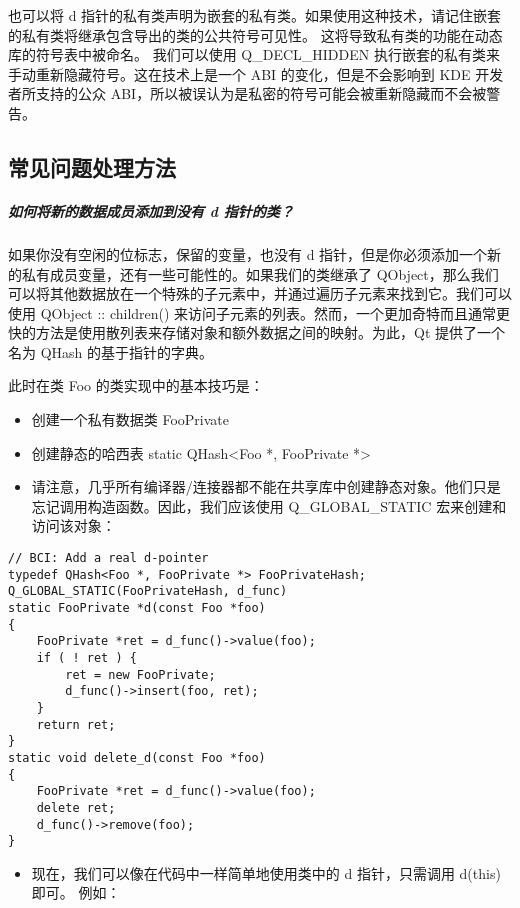 也可以将 d
指针的私有类声明为嵌套的私有类。如果使用这种技术，请记住嵌套的私有类将继承包含导出的类的公共符号可见性。
这将导致私有类的功能在动态库的符号表中被命名。 我们可以使用
Q\_DECL\_HIDDEN 执行嵌套的私有类来手动重新隐藏符号。这在技术上是一个 ABI
的变化，但是不会影响到 KDE 开发者所支持的公众
ABI，所以被误认为是私密的符号可能会被重新隐藏而不会被警告。

\subsection{常见问题处理方法}\label{ux5e38ux89c1ux95eeux9898ux5904ux7406ux65b9ux6cd5}

\subparagraph{如何将新的数据成员添加到没有 d
指针的类？}\label{ux5982ux4f55ux5c06ux65b0ux7684ux6570ux636eux6210ux5458ux6dfbux52a0ux5230ux6ca1ux6709-d-ux6307ux9488ux7684ux7c7b}

如果你没有空闲的位标志，保留的变量，也没有 d
指针，但是你必须添加一个新的私有成员变量，还有一些可能性的。如果我们的类继承了
QObject，那么我们可以将其他数据放在一个特殊的子元素中，并通过遍历子元素来找到它。我们可以使用
QObject :: children()
来访问子元素的列表。然而，一个更加奇特而且通常更快的方法是使用散列表来存储对象和额外数据之间的映射。为此，Qt
提供了一个名为 QHash 的基于指针的字典。

此时在类 Foo 的类实现中的基本技巧是：

\begin{itemize}

\item
  创建一个私有数据类 FooPrivate
\item
  创建静态的哈西表 static QHash\textless{}Foo *, FooPrivate
  *\textgreater{}
\item
  请注意，几乎所有编译器/连接器都不能在共享库中创建静态对象。他们只是忘记调用构造函数。因此，我们应该使用
  Q\_GLOBAL\_STATIC 宏来创建和访问该对象：
\end{itemize}

\begin{lstlisting}
// BCI: Add a real d-pointer
typedef QHash<Foo *, FooPrivate *> FooPrivateHash;
Q_GLOBAL_STATIC(FooPrivateHash, d_func)
static FooPrivate *d(const Foo *foo)
{
    FooPrivate *ret = d_func()->value(foo);
    if ( ! ret ) {
        ret = new FooPrivate;
        d_func()->insert(foo, ret);
    }
    return ret;
}
static void delete_d(const Foo *foo)
{
    FooPrivate *ret = d_func()->value(foo);
    delete ret;
    d_func()->remove(foo);
}
\end{lstlisting}

\begin{itemize}

\item
  现在，我们可以像在代码中一样简单地使用类中的 d 指针，只需调用 d(this)
  即可。 例如：
\end{itemize}

